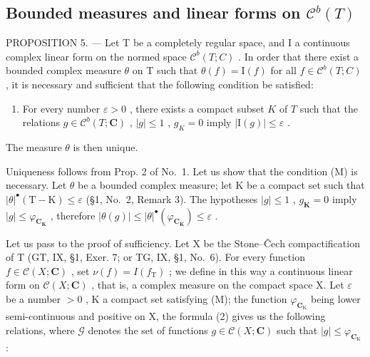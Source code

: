 \subsection{\texorpdfstring{Bounded measures and linear forms on \(\mathcal{C}^{b}(T)\)}{Bounded measures and linear forms on \textbackslash mathcal\{C\}\^{}\{b\}(T)}}

PROPOSITION 5. --- Let T be a completely regular space, and I a continuous complex linear form on the normed space \(\mathcal{C}^{b}(T;C)\) . In order that there exist a bounded complex measure \(\theta\) on T such that \(\theta(f)=\mathrm{I}(f)\) for all \(f\in\mathcal{C}^{b}(T;C)\) , it is necessary and sufficient that the following condition be satisfied:

\begin{enumerate}
\def\labelenumi{(\Alph{enumi})}
\setcounter{enumi}{12}
\tightlist
\item
  For every number \(\varepsilon > 0\) , there exists a compact subset \(K\) of \(T\) such that the relations \(g \in \mathcal{C}^b(T; \mathbf{C})\) , \(|g| \leqslant 1\) , \(g_K = 0\) imply \(|\mathrm{I}(g)| \leqslant \varepsilon\) .
\end{enumerate}

The measure \(\theta\) is then unique.

Uniqueness follows from Prop. 2 of No.~1. Let us show that the condition (M) is necessary. Let \(\theta\) be a bounded complex measure; let K be a compact set such that \(|\theta|^{\bullet}(\mathrm{T}-\mathrm{K}) \leqslant \varepsilon\) (§1, No.~2, Remark 3). The hypotheses \(|g| \leqslant 1\) , \(g_{\mathbf{K}} = 0\) imply \(|g| \leqslant \varphi_{\mathbf{C}_{\mathbf{K}}}\) , therefore \(|\theta(g)| \leqslant |\theta|^{\bullet}(\varphi_{\mathbf{C}_{\mathbf{K}}}) \leqslant \varepsilon\) .

Let us pass to the proof of sufficiency. Let X be the Stone--Čech compactification of T (GT, IX, §1, Exer. 7; or TG, IX, §1, No.~6). For every function \(f \in \mathcal{C}(X; \mathbf{C})\) , set \(\nu(f) = I(f_{\mathrm{T}})\) ; we define in this way a continuous linear form on \(\mathcal{C}(X; \mathbf{C})\) , that is, a complex measure on the compact space X. Let \(\varepsilon\) be a number \(>0\) , K a compact set satisfying (M); the function \(\varphi_{\mathbf{C}_{\mathrm{K}}}\) being lower semi-continuous and positive on X, the formula (2) gives us the following relations, where \(\mathcal{G}\) denotes the set of functions \(g \in \mathcal{C}(X; \mathbf{C})\) such that \(|g| \leqslant \varphi_{\mathbf{C}_{\mathrm{K}}}\) :

